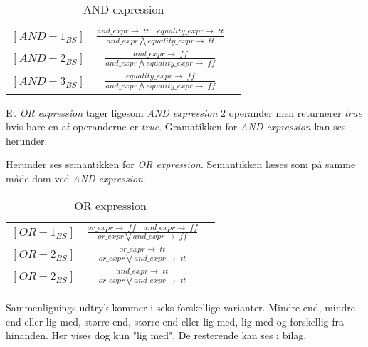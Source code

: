     \bgroup
    \def\arraystretch{3}
    \begin{table}[H]
    \centering
    \begin{tabular}{l c l}
        
        $[AND-1_{BS}]$ &$\frac{and\_expr \rightarrow \; tt \quad equality\_expr \rightarrow \; tt}{and\_expr \bigwedge equality\_expr \rightarrow \; tt}$ & \\
    
        $[AND-2_{BS}]$ &$\frac{and\_expr \rightarrow \; ff}{and\_expr \bigwedge equality\_expr \rightarrow \; ff}$ & \\
        
        $[AND-3_{BS}]$ &$\frac{equality\_expr \rightarrow \; ff}{and\_expr \bigwedge equality\_expr \rightarrow \; ff}$ & \\
        
    \end{tabular}
    \caption{AND expression}
    \label{tab:andexpr}
    \end{table}
    \egroup
Et \textit{OR expression} tager ligesom \textit{AND expression} 2 operander men returnerer \textit{true} hvis bare en af operanderne er \textit{true}. Gramatikken for \textit{AND expression} kan ses herunder.


\noindent Herunder ses semantikken for \textit{OR expression}. Semantikken læses som på samme måde dom ved \textit{AND expression}.

    \bgroup
    \def\arraystretch{3}
    \begin{table}[H]
    \centering
    \begin{tabular}{l c l}
        
        $[OR-1_{BS}]$ &$\frac{or\_expr \rightarrow \; ff \quad and\_expr \rightarrow \; ff}{or\_expr \bigvee and\_expr \rightarrow \; ff}$ & \\
    
        $[OR-2_{BS}]$ &$\frac{or\_expr \rightarrow \; tt}{or\_expr \bigvee and\_expr \rightarrow \; tt}$ &\\
        
        $[OR-2_{BS}]$ &$\frac{and\_expr \rightarrow \; tt}{or\_expr \bigvee and\_expr \rightarrow \; tt}$ &\\
        
    \end{tabular}
    \caption{OR expression}
    \label{tab:orExpr}
    \end{table}
    \egroup
Sammenlignings udtryk kommer i seks forskellige varianter. Mindre end, mindre end eller lig med, større end, større end eller lig med, lig med og forskellig fra hinanden. Her vises dog kun "lig med". De resterende kan ses i bilag.
    
